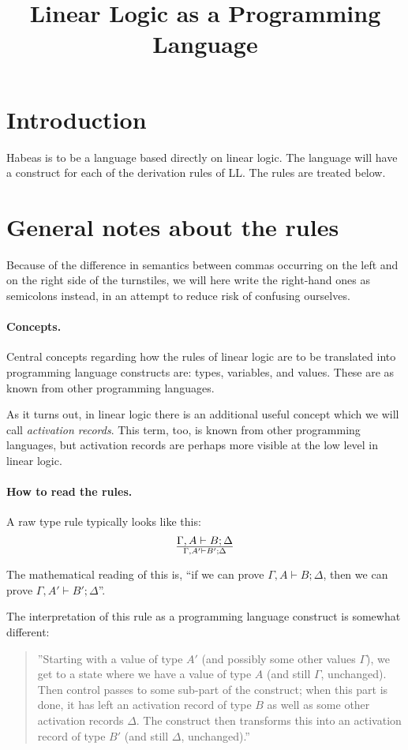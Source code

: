 \documentclass[a4paper]{article}
\title{Linear Logic as a Programming Language}
\begin{document}
\maketitle

\section{Introduction}

Habeas is to be a language based directly on linear logic.
The language will have a construct for each of the derivation rules of LL.
The rules are treated below.

\section{General notes about the rules}

Because of the difference in semantics between commas occurring on the
left and on the right side of the turnstiles, we will here write the
right-hand ones as semicolons instead, in an attempt to reduce risk of
confusing ourselves.

\paragraph{Concepts.} Central concepts regarding how the rules of
linear logic are to be translated into programming language constructs
are: types, variables, and values. These are as known from other
programming languages.

As it turns out, in linear logic there is an additional useful concept
which we will call \emph{activation records}.  This term, too, is
known from other programming languages, but activation records are
perhaps more visible at the low level in linear logic.

\paragraph{How to read the rules.} A raw type rule typically looks like this:
$$
{\Gamma,A \vdash B;\Delta}\over{\Gamma,A' \vdash B';\Delta}
$$

The mathematical reading of this is, ``if we can prove ${\Gamma,A
  \vdash B;\Delta}$, then we can prove ${\Gamma,A' \vdash B';\Delta}$''.


The interpretation of this rule as a programming language construct is
somewhat different:
\begin{quote}
  ''Starting with a value of type $A'$ (and possibly some other values
  $\Gamma$), we get to a state where we have a value of type $A$ (and
  still $\Gamma$, unchanged). Then control passes to some sub-part of
  the construct; when this part is done, it has left an activation
  record of type $B$ as well as some other activation records
  $\Delta$. The construct then transforms this into an activation
  record of type $B'$ (and still $\Delta$, unchanged).''
\end{quote}
\end{document}
